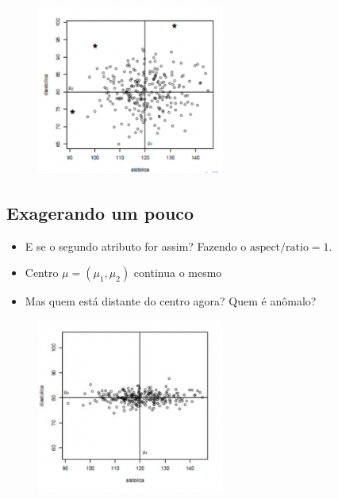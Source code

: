 \documentclass[
  letterpaper,
  DIV=11,
  numbers=noendperiod]{scrartcl}
\providecommand{\tightlist}{%
  \setlength{\itemsep}{0pt}\setlength{\parskip}{0pt}}\usepackage{longtable,booktabs,array}
\begin{document}
\begin{figure}

{\centering \includegraphics[width=0.55\textwidth,height=\textheight]{figs/Aula07/distancia_pressao.png}

}

\end{figure}

\hypertarget{exagerando-um-pouco}{%
\subsection{Exagerando um pouco}\label{exagerando-um-pouco}}

\begin{itemize}
\tightlist
\item
  E se o segundo atributo for assim? Fazendo o
  \(\text{aspect/ratio} = 1\).
\item
  Centro \(\mu = (\mu_1, \mu_2)\) continua o mesmo
\item
  Mas quem está distante do centro agora? Quem é anômalo?
\end{itemize}

\begin{figure}

{\centering \includegraphics[width=0.55\textwidth,height=\textheight]{figs/Aula07/pressao2.png}

}

\end{figure}
\end{document}

